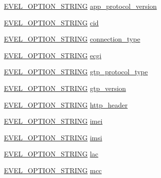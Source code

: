 \begin{DoxyCompactItemize}
\item 
\hyperlink{evel_8h_a0de5113a7b72de93c0c7b644f7ea7ec3}{E\+V\+E\+L\+\_\+\+O\+P\+T\+I\+O\+N\+\_\+\+S\+T\+R\+I\+NG} \hyperlink{structevent__mobile__flow_a3eeb397d0b7f1999d602092cf36bd65c}{app\+\_\+protocol\+\_\+version}
\item 
\hyperlink{evel_8h_a0de5113a7b72de93c0c7b644f7ea7ec3}{E\+V\+E\+L\+\_\+\+O\+P\+T\+I\+O\+N\+\_\+\+S\+T\+R\+I\+NG} \hyperlink{structevent__mobile__flow_a18a338f6d1031fd2a5e6bc96e8d33027}{cid}
\item 
\hyperlink{evel_8h_a0de5113a7b72de93c0c7b644f7ea7ec3}{E\+V\+E\+L\+\_\+\+O\+P\+T\+I\+O\+N\+\_\+\+S\+T\+R\+I\+NG} \hyperlink{structevent__mobile__flow_a5cb4efa1bf6c21ec2ff624659e9c24ca}{connection\+\_\+type}
\item 
\hyperlink{evel_8h_a0de5113a7b72de93c0c7b644f7ea7ec3}{E\+V\+E\+L\+\_\+\+O\+P\+T\+I\+O\+N\+\_\+\+S\+T\+R\+I\+NG} \hyperlink{structevent__mobile__flow_a62eb47084718afbf58888eb5dc24da48}{ecgi}
\item 
\hyperlink{evel_8h_a0de5113a7b72de93c0c7b644f7ea7ec3}{E\+V\+E\+L\+\_\+\+O\+P\+T\+I\+O\+N\+\_\+\+S\+T\+R\+I\+NG} \hyperlink{structevent__mobile__flow_ab3e65773132fa368adbaccdef4fc1b81}{gtp\+\_\+protocol\+\_\+type}
\item 
\hyperlink{evel_8h_a0de5113a7b72de93c0c7b644f7ea7ec3}{E\+V\+E\+L\+\_\+\+O\+P\+T\+I\+O\+N\+\_\+\+S\+T\+R\+I\+NG} \hyperlink{structevent__mobile__flow_a9c9d6c5ca9f9e85dd73219b1c6172234}{gtp\+\_\+version}
\item 
\hyperlink{evel_8h_a0de5113a7b72de93c0c7b644f7ea7ec3}{E\+V\+E\+L\+\_\+\+O\+P\+T\+I\+O\+N\+\_\+\+S\+T\+R\+I\+NG} \hyperlink{structevent__mobile__flow_a88dc829e4f3464d48803a3a1dd277c4c}{http\+\_\+header}
\item 
\hyperlink{evel_8h_a0de5113a7b72de93c0c7b644f7ea7ec3}{E\+V\+E\+L\+\_\+\+O\+P\+T\+I\+O\+N\+\_\+\+S\+T\+R\+I\+NG} \hyperlink{structevent__mobile__flow_ad709177c1d1780d9687ad06db4312025}{imei}
\item 
\hyperlink{evel_8h_a0de5113a7b72de93c0c7b644f7ea7ec3}{E\+V\+E\+L\+\_\+\+O\+P\+T\+I\+O\+N\+\_\+\+S\+T\+R\+I\+NG} \hyperlink{structevent__mobile__flow_a679225a54e86574386c89a0aca18b522}{imsi}
\item 
\hyperlink{evel_8h_a0de5113a7b72de93c0c7b644f7ea7ec3}{E\+V\+E\+L\+\_\+\+O\+P\+T\+I\+O\+N\+\_\+\+S\+T\+R\+I\+NG} \hyperlink{structevent__mobile__flow_ada856682c9df790a67f690818e4823c1}{lac}
\item 
\hyperlink{evel_8h_a0de5113a7b72de93c0c7b644f7ea7ec3}{E\+V\+E\+L\+\_\+\+O\+P\+T\+I\+O\+N\+\_\+\+S\+T\+R\+I\+NG} \hyperlink{structevent__mobile__flow_a1905de94c6a3ead7a453f561f17feb77}{mcc}

\end{DoxyCompactItemize}
